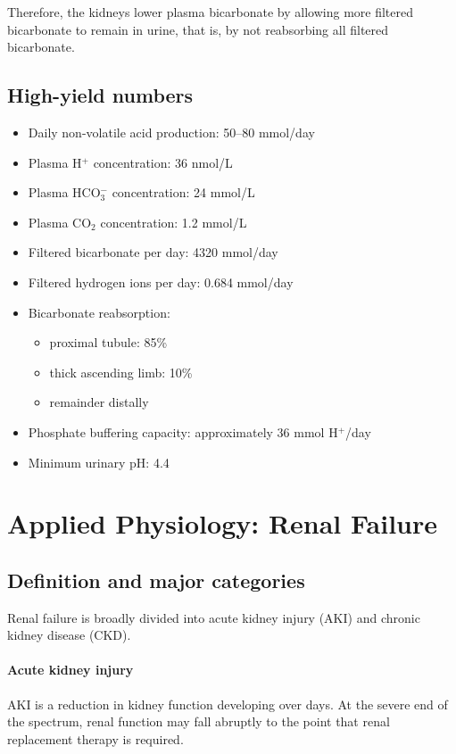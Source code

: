 \documentclass[11pt,a4paper]{article}
\begin{document}
Therefore, the kidneys lower plasma bicarbonate by allowing more filtered bicarbonate to remain in urine, that is, by not reabsorbing all filtered bicarbonate.

\subsection{High-yield numbers}

\begin{itemize}
    \item Daily non-volatile acid production: 50--80 mmol/day
    \item Plasma H$^+$ concentration: 36 nmol/L
    \item Plasma HCO$_3^-$ concentration: 24 mmol/L
    \item Plasma CO$_2$ concentration: 1.2 mmol/L
    \item Filtered bicarbonate per day: 4320 mmol/day
    \item Filtered hydrogen ions per day: 0.684 mmol/day
    \item Bicarbonate reabsorption:
    \begin{itemize}
        \item proximal tubule: 85\%
        \item thick ascending limb: 10\%
        \item remainder distally
    \end{itemize}
    \item Phosphate buffering capacity: approximately 36 mmol H$^+$/day
    \item Minimum urinary pH: 4.4
\end{itemize}

\section{Applied Physiology: Renal Failure}

\subsection{Definition and major categories}

Renal failure is broadly divided into acute kidney injury (AKI) and chronic kidney disease (CKD).

\paragraph{Acute kidney injury}
AKI is a reduction in kidney function developing over days. At the severe end of the spectrum, renal function may fall abruptly to the point that renal replacement therapy is required.
\end{document}
